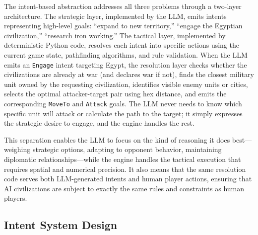 \documentclass[conference]{IEEEtran}
\begin{document}
The intent-based abstraction addresses all three problems through a two-layer architecture. The strategic layer, implemented by the LLM, emits intents representing high-level goals: ``expand to new territory,'' ``engage the Egyptian civilization,'' ``research iron working.'' The tactical layer, implemented by deterministic Python code, resolves each intent into specific actions using the current game state, pathfinding algorithms, and rule validation. When the LLM emits an \texttt{Engage} intent targeting Egypt, the resolution layer checks whether the civilizations are already at war (and declares war if not), finds the closest military unit owned by the requesting civilization, identifies visible enemy units or cities, selects the optimal attacker-target pair using hex distance, and emits the corresponding \texttt{MoveTo} and \texttt{Attack} goals. The LLM never needs to know which specific unit will attack or calculate the path to the target; it simply expresses the strategic desire to engage, and the engine handles the rest.

This separation enables the LLM to focus on the kind of reasoning it does best---weighing strategic options, adapting to opponent behavior, maintaining diplomatic relationships---while the engine handles the tactical execution that requires spatial and numerical precision. It also means that the same resolution code serves both LLM-generated intents and human player actions, ensuring that AI civilizations are subject to exactly the same rules and constraints as human players.

\subsection{Intent System Design}
\end{document}
